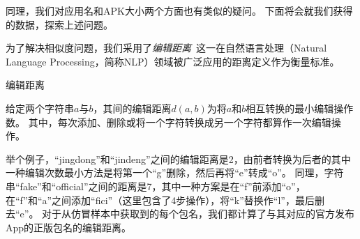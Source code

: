 同理，我们对应用名和APK大小两个方面也有类似的疑问。
下面将会就我们获得的数据，探索上述问题。

为了解决相似度问题，我们采用了\textit{编辑距离}~\cite{levenshtein1966binary}这一在自然语言处理（Natural Language Processing，简称NLP）领域被广泛应用的距离定义作为衡量标准。

\begin{Def}
	编辑距离

	给定两个字符串$a$与$b$，其间的编辑距离$d(a, b)$为将$a$和$b$相互转换的最小编辑操作数。
	其中，每次添加、删除或将一个字符转换成另一个字符都算作一次编辑操作。
\end{Def}

举个例子，``jingdong''和``jindeng''之间的编辑距离是2，由前者转换为后者的其中一种编辑次数最小方法是将第一个``g''删除，然后再将``e''转成``o''。
同理，字符串``fake''和``official''之间的距离是7，其中一种方案是在``f''前添加``o''，在``f''和``a''之间添加``fici''（这里包含了4步操作），将``k''替换作``l''，最后删去``e''。
对于从仿冒样本中获取到的每个包名，我们都计算了与其对应的官方发布App的正版包名的编辑距离。

